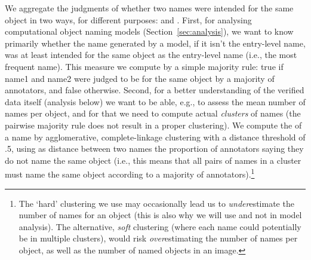 We aggregate the judgments of whether two names were intended for the same object in two ways, for different purposes: \sameobject and \cluster.
First, for analysing computational object naming models (Section~\ref{sec:analysis}), 
we want to know primarily whether the name generated by a model, if it isn't the entry-level name, was at least intended for the same object as the entry-level name (i.e., the most frequent name).
This \textbf{\sameobject} measure we compute by a simple majority rule: true if name1 and name2 were judged to be for the same object by a majority of annotators, and false otherwise.
Second, for a better understanding of the verified \mn data itself (analysis below) we want to be able, e.g., to assess the mean number of names per object, and for that we need to compute actual \emph{clusters} of names (the pairwise majority rule does not result in a proper clustering). 
We compute the \textbf{\cluster} of a name by agglomerative, complete-linkage clustering with a distance threshold of .5, using as distance between two names the proportion of annotators saying they do not name the same object (i.e., this means that all pairs of names in a cluster must name the same object according to a majority of annotators).\footnote{
	The `hard' clustering we use may occasionally lead us to \emph{under}estimate the number of names for an object (this is also why we will use \sameobject and not \cluster in model analysis). The alternative, \emph{soft} clustering (where each name could potentially be in multiple clusters), would risk \emph{over}estimating the number of names per object, as well as the number of named objects in an image.
}






